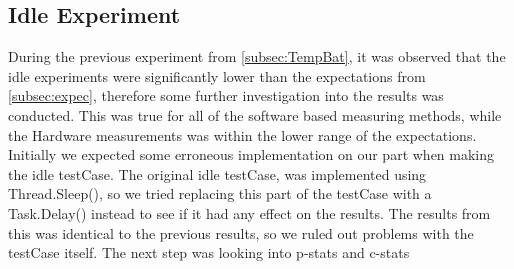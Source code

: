 \subsection{Idle Experiment}
During the previous experiment from \cref{subsec:TempBat}, it was observed that the idle experiments were significantly lower than the expectations from \cref{subsec:expec}, therefore some further investigation into the results was conducted. This was true for all of the software based measuring methods, while the Hardware measurements was within the lower range of the expectations. Initially we expected some erroneous implementation on our part when making the idle testCase. The original idle testCase, was implemented using Thread.Sleep(), so we tried replacing this part of the testCase with a Task.Delay() instead to see if it had any effect on the results. The results from this was identical to the previous results, so we ruled out problems with the testCase itself. The next step was looking into p-stats and c-stats
